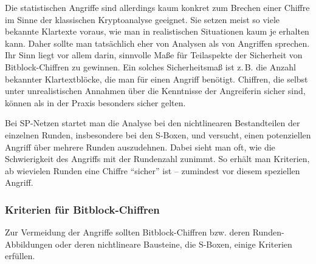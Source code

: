 \begin{refsegment}
Die statistischen Angriffe sind allerdings kaum konkret zum Brechen
einer Chiffre im Sinne der klassischen Kryptoanalyse geeignet.
Sie setzen meist so viele bekannte
Klartexte voraus,
wie man in
realistischen Situationen kaum je erhalten kann. Daher sollte man
tatsächlich eher von Analysen als von Angriffen sprechen. Ihr Sinn liegt
vor allem darin, sinnvolle Maße für Teilaspekte der Sicherheit von
Bitblock-Chiffren zu gewinnen. Ein solches Sicherheitsmaß ist
z.\,B. die Anzahl bekannter Klartextblöcke, die man für einen
Angriff benötigt. Chiffren, die selbst unter
unrealistischen Annahmen über die Kenntnisse der Angreiferin sicher sind,
können als in der Praxis besonders sicher gelten.

Bei SP-Netzen startet man die Analyse bei den nichtlinearen
Bestandteilen der einzelnen Runden, insbesondere bei den S-Boxen,
und versucht, einen potenziellen Angriff über mehrere Runden auszudehnen.
Dabei sieht man oft, wie die Schwierigkeit des Angriffs mit der Rundenzahl
zunimmt. So erhält man Kriterien, ab wievielen Runden eine Chiffre
"`sicher"' ist -- zumindest vor diesem speziellen Angriff.


\subsubsection*{Kriterien für Bitblock-Chiffren}

Zur Vermeidung der Angriffe sollten Bitblock-Chiffren bzw. deren
Runden-Abbildungen oder deren nichtlineare Bausteine, die S-Boxen,
einige Kriterien erfüllen.


\end{refsegment}
